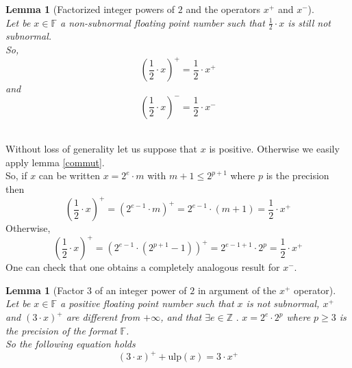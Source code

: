\documentclass[a4paper,10pt,twoside]{article}
\newtheorem{lemma}[theorem]{Lemma}
\newenvironment{proof}[1][Proof]{\begin{trivlist}
\item[\hskip \labelsep {\bfseries #1}]}{\end{trivlist}}
\newcommand{\qed}{\nobreak \ifvmode \relax \else \ifdim \lastskip<1.5em \hskip-\lastskip
\hskip1.5em plus0em minus0.5em \fi \nobreak \vrule height0.75em width0.5em depth0.25em\fi}
\newcommand{\Z}{\ensuremath{\mathbb {Z}}}
\newcommand{\F}{\ensuremath{\mathbb {F}}}
\newcommand{\mUlp}{\ensuremath{\mathrm{ulp}}}
\begin{document}
\begin{lemma}[Factorized integer powers of $2$ and the operators $x^+$ and $x^-$] \label{multhalf} ~\\
Let be $x \in \F$ a non-subnormal floating point number such that $\frac{1}{2} \cdot x$ is still not subnormal.\\
So,
$$\left(\frac{1}{2} \cdot x \right)^+ = \frac{1}{2} \cdot x^+$$
and
$$\left(\frac{1}{2} \cdot x \right)^- = \frac{1}{2} \cdot x^-$$
\end{lemma}
\begin{proof} ~ \\
Without loss of generality let us suppose that $x$ is positive. Otherwise we easily apply lemma \ref{commut}. \\
So, if $x$ can be written $x = 2^e \cdot m$ with $m + 1 \leq 2^{p+1}$ where $p$ is the precision then
$$\left( \frac{1}{2} \cdot x \right)^+ = \left( 2^{e-1} \cdot m \right)^+ = 2^{e-1} \cdot \left(m+1\right) = \frac{1}{2} \cdot x^+$$
Otherwise,
$$\left( \frac{1}{2} \cdot x \right)^+ = \left( 2^{e-1} \cdot \left( 2^{p+1} -1 \right) \right)^+
= 2^{e-1+1} \cdot 2^p = \frac{1}{2} \cdot x^+$$
One can check that one obtains a completely analogous result for $x^-$.\qed
\end{proof}
\begin{lemma}[Factor $3$ of an integer power of $2$ in argument of the $x^+$ operator] \label{succtroisfoispuissdeux} ~ \\
Let be $x \in \F$ a positive floating point number such that $x$ is not subnormal, $x^+$ and $\left( 3 \cdot x \right)^+$
are different from $+\infty$, and that $\exists e \in \Z \mbox{ . } x = 2^e \cdot 2^p$ where $p \geq 3$ is the precision
of the format $\F$.\\
So the following equation holds
$$\left( 3 \cdot x \right)^+ + \mUlp\left( x \right) = 3 \cdot x^+$$
\end{lemma}
\end{document}
